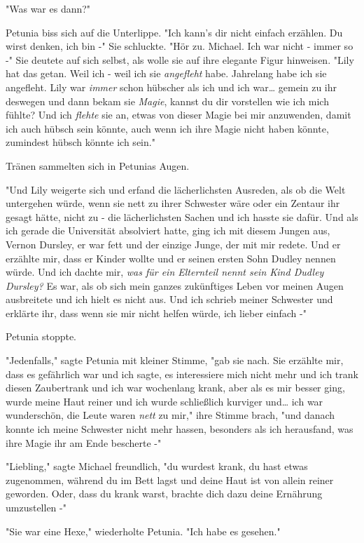 {"Was war es dann?"

Petunia biss sich auf die Unterlippe. "Ich kann's dir nicht einfach erzählen. Du wirst denken, ich bin -" Sie schluckte. "Hör zu. Michael. Ich war nicht - immer so -" Sie deutete auf sich selbst, als wolle sie auf ihre elegante Figur hinweisen. "Lily hat das getan. Weil ich - weil ich sie \emph{angefleht} habe. Jahrelang habe ich sie angefleht. Lily war \emph{immer} schon hübscher als ich und ich war… gemein zu ihr deswegen und dann bekam sie \emph{Magie}, kannst du dir vorstellen wie ich mich fühlte? Und ich \emph{flehte} sie an, etwas von dieser Magie bei mir anzuwenden, damit ich auch hübsch sein könnte, auch wenn ich ihre Magie nicht haben könnte, zumindest hübsch könnte ich sein."

Tränen sammelten sich in Petunias Augen.

"Und Lily weigerte sich und erfand die lächerlichsten Ausreden, als ob die Welt untergehen würde, wenn sie nett zu ihrer Schwester wäre oder ein Zentaur ihr gesagt hätte, nicht zu - die lächerlichsten Sachen und ich hasste sie dafür. Und als ich gerade die Universität absolviert hatte, ging ich mit diesem Jungen aus, Vernon Dursley, er war fett und der einzige Junge, der mit mir redete. Und er erzählte mir, dass er Kinder wollte und er seinen ersten Sohn Dudley nennen würde. Und ich dachte mir, \emph{was für ein Elternteil nennt sein Kind Dudley Dursley?} Es war, als ob sich mein ganzes zukünftiges Leben vor meinen Augen ausbreitete und ich hielt es nicht aus. Und ich schrieb meiner Schwester und erklärte ihr, dass wenn sie mir nicht helfen würde, ich lieber einfach -"

Petunia stoppte.

"Jedenfalls," sagte Petunia mit kleiner Stimme, "gab sie nach. Sie erzählte mir, dass es gefährlich war und ich sagte, es interessiere mich nicht mehr und ich trank diesen Zaubertrank und ich war wochenlang krank, aber als es mir besser ging, wurde meine Haut reiner und ich wurde schließlich kurviger und… ich war wunderschön, die Leute waren \emph{nett} zu mir," ihre Stimme brach, "und danach konnte ich meine Schwester nicht mehr hassen, besonders als ich herausfand, was ihre Magie ihr am Ende bescherte -"

"Liebling," sagte Michael freundlich, "du wurdest krank, du hast etwas zugenommen, während du im Bett lagst und deine Haut ist von allein reiner geworden. Oder, dass du krank warst, brachte dich dazu deine Ernährung umzustellen -"

"Sie war eine Hexe," wiederholte Petunia. "Ich habe es gesehen."

}

